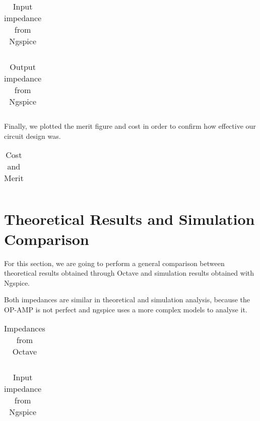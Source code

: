 \begin{table}[H]
\centering
\begin{tabularx}{0.6\textwidth} {
  | >{\raggedright\arraybackslash}X
  | >{\raggedleft\arraybackslash}X | }
 \hline

\end{tabularx}
\caption{Input impedance from Ngspice}
\label{tab7}
\end{table}

\begin{table}[H]
\centering
\begin{tabularx}{0.6\textwidth} {
  | >{\raggedright\arraybackslash}X
  | >{\raggedleft\arraybackslash}X | }
 \hline

\end{tabularx}
\caption{Output impedance from Ngspice}
\label{tab8}
\end{table}



Finally, we plotted the merit figure and cost in order to confirm how effective our circuit design was.


\begin{table}[H]
\centering
\begin{tabularx}{0.6\textwidth} {
  | >{\raggedright\arraybackslash}X
  | >{\raggedleft\arraybackslash}X | }
 \hline

\end{tabularx}
\caption{Cost and Merit}
\end{table}
\section{Theoretical Results and Simulation Comparison}



For this section, we are going to perform a general comparison between theoretical results obtained through Octave and simulation results obtained with Ngspice.

Both impedances are similar in theoretical and simulation
analysis, because the OP-AMP is not perfect and ngspice uses a more complex models to analyse it.

\begin{table}[H]
\centering
\begin{tabularx}{0.6\textwidth} {
  | >{\raggedright\arraybackslash}X
  | >{\raggedleft\arraybackslash}X | }
 \hline

\end{tabularx}
\caption{Impedances from Octave}
\end{table}

\begin{table}[H]
\centering
\begin{tabularx}{0.6\textwidth} {
  | >{\raggedright\arraybackslash}X
  | >{\raggedleft\arraybackslash}X | }
 \hline

\end{tabularx}
\caption{Input impedance from Ngspice}
\label{tab17}
\end{table}

